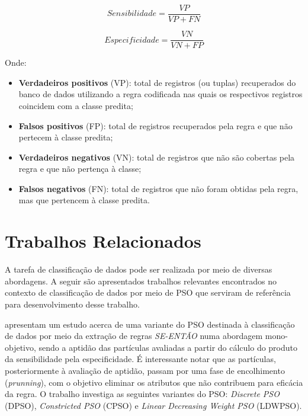 \documentclass[
	12pt,				%
	openany,			%
	oneside,	
	a4paper,			%
	brazil,				%
	]{unimontes-ppgmsc-abntex2}
\begin{document}
\begin{equation}
\label{eq:sensibilidade}
Sensibilidade = \frac{VP}{VP + FN}
\end{equation}

\begin{equation}
\label{eq:especificidade}
Especificidade = \frac{VN}{VN + FP}
\end{equation}

Onde:

\begin{itemize}
\item \textbf{Verdadeiros positivos} (VP): total de registros (ou tuplas) recuperados do banco de dados utilizando a regra codificada nas quais os respectivos registros coincidem com a classe predita; 

\item \textbf{Falsos positivos} (FP): total de registros recuperados pela regra e que não pertecem à classe predita;

\item \textbf{Verdadeiros negativos} (VN): total de registros que não são cobertas pela regra e que não pertença à classe; 

\item \textbf{Falsos negativos} (FN): total de registros que não foram obtidas pela regra, mas que pertencem à classe predita.
\end{itemize}

\section{Trabalhos Relacionados}
\label{sec:trabalhos_relacionados}

A tarefa de classificação de dados pode ser realizada por meio de diversas abordagens. A seguir são apresentados trabalhos relevantes encontrados no contexto de classificação de dados por meio de PSO que serviram de referência para desenvolvimento desse trabalho.

 apresentam um estudo acerca de uma variante do PSO destinada à classificação de dados por meio da extração de regras {\em SE-ENTÃO} numa abordagem mono-objetivo, sendo a aptidão das partículas avaliadas a partir do cálculo do produto da sensibilidade pela especificidade. É interessante notar que as partículas, posteriormente à avaliação de aptidão, passam por uma fase de encolhimento ({\em prunning}), com o objetivo eliminar os atributos que não contribuem para eficácia da regra. O trabalho investiga as seguintes variantes do PSO: {\em Discrete PSO} (DPSO), {\em Constricted PSO} (CPSO) e {\em Linear Decreasing Weight PSO} (LDWPSO).
\end{document}
